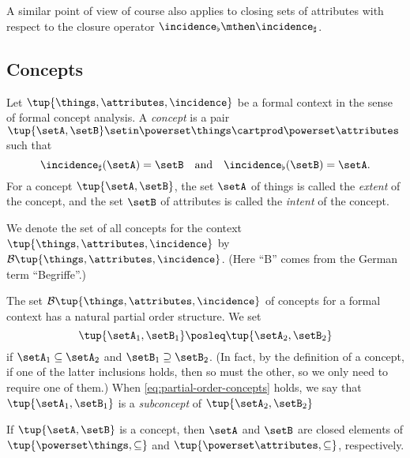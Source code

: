 A similar point of view of course also applies to closing sets of attributes with respect to the closure operator $\incidence_\flat \mthen \incidence_\sharp$.

\subsection{Concepts}

\begin{definition}\label{def:cfa-concept}
    Let $\tup{\things, \attributes, \incidence}$ be a formal context in the sense of formal concept analysis.
    A \emph{concept} is a pair $\tup{\setA, \setB} \setin \powerset\things \cartprod \powerset\attributes$ such that
    \begin{equation}\label{eq:def-concept-equations}
        \incidence_\sharp(\setA) = \setB \quad \text{and} \quad \incidence_\flat(\setB) = \setA.
    \end{equation}
    For a concept $\tup{\setA, \setB}$, the set $\setA$ of things is called the \emph{extent} of the concept, and the set $\setB$ of attributes is called the \emph{intent} of the concept.

    We denote the set of all concepts for the context $\tup{\things, \attributes, \incidence}$ by $\mathcal{B}\tup{\things, \attributes, \incidence}$.
    (Here ``B'' comes from the German term ``Begriffe''.)
\end{definition}

The set $\mathcal{B}\tup{\things, \attributes, \incidence}$ of concepts for a formal context has a natural partial order structure.
We set
\begin{equation}\label{eq:partial-order-concepts}
    \tup{\setA_1, \setB_1} \posleq \tup{\setA_2, \setB_2}
\end{equation}
if $\setA_1 \subseteq \setA_2$ and $\setB_1 \supseteq \setB_2$.
(In fact, by the definition of a concept, if one of the latter inclusions holds, then so must the other, so we only need to require one of them.) When \cref{eq:partial-order-concepts} holds, we say that $\tup{\setA_1, \setB_1}$ is a \emph{subconcept} of $\tup{\setA_2, \setB_2}$

\begin{lemma}\label{lem:extents-and-intents-are-closed}
    If $\tup{\setA, \setB}$ is a concept, then $\setA$ and $\setB$ are closed elements of $\tup{\powerset \things, \subseteq}$ and $\tup{\powerset \attributes, \subseteq}$, respectively.
\end{lemma}

